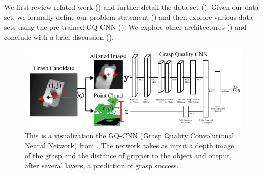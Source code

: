 We first review related work () and further detail the data set (). 
Given our data set, we formally define our problem statement () and then explore various data sets using the pre-trained GQ-CNN (). 
We explore other architectures () and conclude with a brief discussion (). 

\begin{figure}[t!]
    \includegraphics[width=0.99\columnwidth]{figs/dexnet.PNG}
\caption{This is a visualization the GQ-CNN (Grasp Quality Convolutional Neural Network) from \cite{mahler2017dex}. The network takes as input a depth image of the grasp and the distance of gripper to the object and output, after several layers, a prediction of grasp success.} \label{fig:dexnet_network}
\end{figure}

